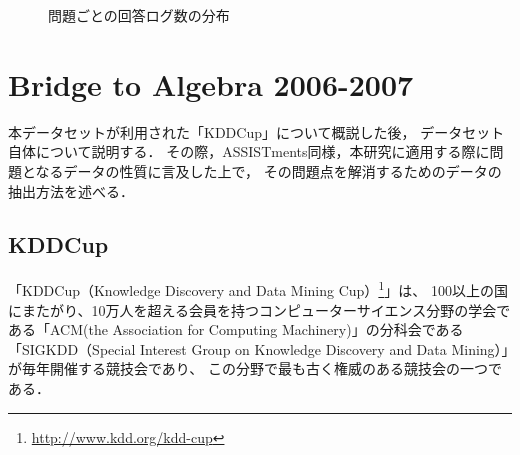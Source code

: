 \begin{figure}[t]
\begin{center}
\hspace*{-20pt}
\end{center}
\caption{問題ごとの回答ログ数の分布}
\end{figure}



\section{Bridge to Algebra 2006-2007}
本データセットが利用された「KDDCup」について概説した後，
データセット自体について説明する．
その際，ASSISTments同様，本研究に適用する際に問題となるデータの性質に言及した上で，
その問題点を解消するためのデータの抽出方法を述べる．


\subsection{KDDCup}
「KDDCup（Knowledge Discovery and Data Mining Cup）\footnote{\url{http://www.kdd.org/kdd-cup}}」は、
100以上の国にまたがり、10万人を超える会員を持つコンピューターサイエンス分野の学会である「ACM(the Association for Computing Machinery)」の分科会である
「SIGKDD（Special Interest Group on Knowledge Discovery and Data Mining）」が毎年開催する競技会であり、
この分野で最も古く権威のある競技会の一つである．


